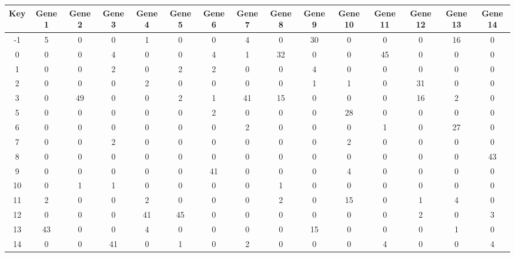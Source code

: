 \begin{tabular}{|c|c|c|c|c|c|c|c|c|c|c|c|c|c|c|}
\hline
Key & Gene 1 & Gene 2 & Gene 3 & Gene 4 & Gene 5 & Gene 6 & Gene 7 & Gene 8 & Gene 9 & Gene 10 & Gene 11 & Gene 12 & Gene 13 & Gene 14 \\
\hline
-1 & 5 & 0 & 0 & 1 & 0 & 0 & 4 & 0 & 30 & 0 & 0 & 0 & 16 & 0 \\
0 & 0 & 0 & 4 & 0 & 0 & 4 & 1 & 32 & 0 & 0 & 45 & 0 & 0 & 0 \\
1 & 0 & 0 & 2 & 0 & 2 & 2 & 0 & 0 & 4 & 0 & 0 & 0 & 0 & 0 \\
2 & 0 & 0 & 0 & 2 & 0 & 0 & 0 & 0 & 1 & 1 & 0 & 31 & 0 & 0 \\
3 & 0 & 49 & 0 & 0 & 2 & 1 & 41 & 15 & 0 & 0 & 0 & 16 & 2 & 0 \\
5 & 0 & 0 & 0 & 0 & 0 & 2 & 0 & 0 & 0 & 28 & 0 & 0 & 0 & 0 \\
6 & 0 & 0 & 0 & 0 & 0 & 0 & 2 & 0 & 0 & 0 & 1 & 0 & 27 & 0 \\
7 & 0 & 0 & 2 & 0 & 0 & 0 & 0 & 0 & 0 & 2 & 0 & 0 & 0 & 0 \\
8 & 0 & 0 & 0 & 0 & 0 & 0 & 0 & 0 & 0 & 0 & 0 & 0 & 0 & 43 \\
9 & 0 & 0 & 0 & 0 & 0 & 41 & 0 & 0 & 0 & 4 & 0 & 0 & 0 & 0 \\
10 & 0 & 1 & 1 & 0 & 0 & 0 & 0 & 1 & 0 & 0 & 0 & 0 & 0 & 0 \\
11 & 2 & 0 & 0 & 2 & 0 & 0 & 0 & 2 & 0 & 15 & 0 & 1 & 4 & 0 \\
12 & 0 & 0 & 0 & 41 & 45 & 0 & 0 & 0 & 0 & 0 & 0 & 2 & 0 & 3 \\
13 & 43 & 0 & 0 & 4 & 0 & 0 & 0 & 0 & 15 & 0 & 0 & 0 & 1 & 0 \\
14 & 0 & 0 & 41 & 0 & 1 & 0 & 2 & 0 & 0 & 0 & 4 & 0 & 0 & 4 \\
\hline
\end{tabular}